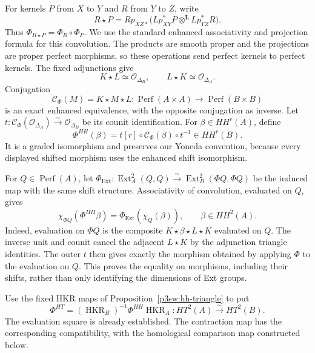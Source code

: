 \documentclass[11pt]{article}
\numberwithin{equation}{section}
\begin{document}
For kernels \(P\) from \(X\) to \(Y\) and \(R\) from \(Y\) to \(Z\),
write
\[
 R\star P
  =Rp_{XZ*}\bigl(Lp_{XY}^*P\otimes^{\mathbf L}Lp_{YZ}^*R\bigr).
\]
Thus \(\Phi_{R\star P}=\Phi_R\circ\Phi_P\).
We use the standard enhanced associativity and projection formula for
this convolution.  The products are smooth proper and the
projections are proper perfect morphisms, so these operations send
perfect kernels to perfect kernels.  The fixed adjunctions give
\[
 K\star L\simeq\mathcal O_{\Delta_B},
 \qquad L\star K\simeq\mathcal O_{\Delta_A}.
\]
Conjugation
\[
 \mathcal C_\Phi(M)=K\star M\star L
       :\operatorname{Perf}(A\times A)
           \longrightarrow\operatorname{Perf}(B\times B)
\]
is an exact enhanced equivalence, with the opposite conjugation as
inverse.  Let
\(t:\mathcal C_\Phi(\mathcal O_{\Delta_A})
       \xrightarrow{\sim}\mathcal O_{\Delta_B}\)
be its counit identification.  For \(\beta\in HH^r(A)\), define
\begin{equation}
 \Phi^{HH}(\beta)
       =t[r]\circ\mathcal C_\Phi(\beta)\circ t^{-1}
       \in HH^r(B).
\label{p3sw:hh-eq:hh-conjugation}
\end{equation}
It is a graded isomorphism and preserves our Yoneda convention,
because every displayed shifted morphism uses the enhanced shift
isomorphism.

For \(Q\in\operatorname{Perf}(A)\), let
\(\Phi_{\mathrm{Ext}}:\operatorname{Ext}^2_A(Q,Q)
\xrightarrow{\sim}\operatorname{Ext}^2_B(\Phi Q,\Phi Q)\)
be the induced map with the same shift structure.  Associativity of
convolution, evaluated on \(Q\), gives
\begin{equation}
 \chi_{\Phi Q}(\Phi^{HH}\beta)
       =\Phi_{\mathrm{Ext}}(\chi_Q(\beta)),
       \qquad \beta\in HH^2(A).
\label{p3sw:hh-eq:evaluation-square}
\end{equation}
Indeed, evaluation on \(\Phi Q\) is the composite
\(K\star\beta\star L\star K\) evaluated on \(Q\).  The inverse unit
and counit cancel the adjacent \(L\star K\) by the adjunction triangle
identities.  The outer \(t\) then gives
exactly the morphism obtained by applying \(\Phi\) to the evaluation
on \(Q\).  This proves the equality on morphisms, including their
shifts, rather than only identifying the dimensions of Ext groups.

Use the fixed HKR maps of
Proposition~\ref{p3sw:hh-triangle} to put
\[
 \Phi^{HT}
   =(\operatorname{HKR}_B)^{-1}\Phi^{HH}\operatorname{HKR}_A:
       HT^2(A)\xrightarrow{\sim}HT^2(B).
\]
The evaluation square is already established.  The contraction map has
the corresponding compatibility, with the homological comparison map
constructed below.
\end{document}
